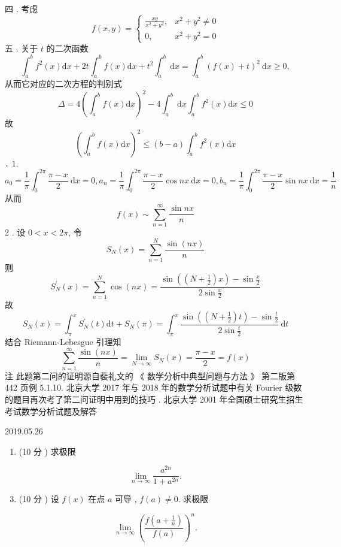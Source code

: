 \documentclass[10pt]{article}
\begin{document}
 四 .  考虑 
$$
f(x, y)= \begin{cases}\frac{x y}{x^{2}+y^{2}}, & x^{2}+y^{2} \neq 0 \\ 0, & x^{2}+y^{2}=0\end{cases}
$$
 五 .  关于  $t$  的二次函数 
$$
\int_{a}^{b} f^{2}(x) \mathrm{d} x+2 t \int_{a}^{b} f(x) \mathrm{d} x+t^{2} \int_{a}^{b} \mathrm{~d} x=\int_{a}^{b}(f(x)+t)^{2} \mathrm{~d} x \geqslant 0,
$$
 从而它对应的二次方程的判别式 
$$
\Delta=4\left(\int_{a}^{b} f(x) \mathrm{d} x\right)^{2}-4 \int_{a}^{b} \mathrm{~d} x \int_{a}^{b} f^{2}(x) \mathrm{d} x \leqslant 0
$$
 故 
$$
\left(\int_{a}^{b} f(x) \mathrm{d} x\right)^{2} \leqslant(b-a) \int_{a}^{b} f^{2}(x) \mathrm{d} x
$$
․ $1 .$
$$
a_{0}=\frac{1}{\pi} \int_{0}^{2 \pi} \frac{\pi-x}{2} \mathrm{~d} x=0, a_{n}=\frac{1}{\pi} \int_{0}^{2 \pi} \frac{\pi-x}{2} \cos n x \mathrm{~d} x=0, b_{n}=\frac{1}{\pi} \int_{0}^{2 \pi} \frac{\pi-x}{2} \sin n x \mathrm{~d} x=\frac{1}{n}
$$
 从而 
$$
f(x) \sim \sum_{n=1}^{\infty} \frac{\sin n x}{n}
$$
2 .  设  $0<x<2 \pi$,  令 
$$
S_{N}(x)=\sum_{n=1}^{N} \frac{\sin (n x)}{n}
$$
 则 
$$
S_{N}^{\prime}(x)=\sum_{n=1}^{N} \cos (n x)=\frac{\sin \left(\left(N+\frac{1}{2}\right) x\right)-\sin \frac{x}{2}}{2 \sin \frac{x}{2}}
$$
 故 
$$
S_{N}(x)=\int_{\pi}^{x} S_{N}^{\prime}(t) \mathrm{d} t+S_{N}(\pi)=\int_{\pi}^{x} \frac{\sin \left(\left(N+\frac{1}{2}\right) t\right)-\sin \frac{t}{2}}{2 \sin \frac{t}{2}} \mathrm{~d} t
$$
 结合  Riemann-Lebesgue  引理知 
$$
\sum_{n=1}^{\infty} \frac{\sin (n x)}{n}=\lim _{N \rightarrow \infty} S_{N}(x)=\frac{\pi-x}{2}=f(x)
$$
 注   此题第二问的证明源自裴礼文的 《 数学分析中典型问题与方法 》 第二版第  442  页例  5.1.10.  北京大学  2017  年与  2018  年的数学分析试题中有关  Fourier  级数的题目再次考了第二问证明中用到的技巧 .  北京大学  2001  年全国硕士研究生招生考试数学分析试题及解答 

   

2019.05.26

\begin{enumerate}
  \item (10  分 )  求极限 
\end{enumerate}
$$
\lim _{n \rightarrow \infty} \frac{a^{2 n}}{1+a^{2 n}} .
$$

\begin{enumerate}
  \setcounter{enumi}{2}
  \item (10  分 )  设  $f(x)$  在点  $a$  可导 , $f(a) \neq 0$.  求极限 
\end{enumerate}
$$
\lim _{n \rightarrow \infty}\left(\frac{f\left(a+\frac{1}{n}\right)}{f(a)}\right)^{n} .
$$
\end{document}
